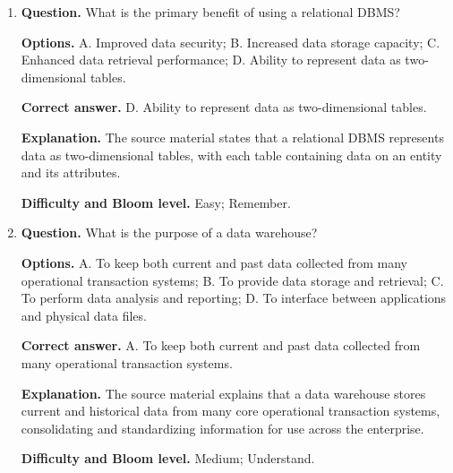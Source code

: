 \documentclass[12pt,a4paper]{article}
\begin{document}
\begin{enumerate}
        \textbf{Options.} A. To reduce data redundancy and improve data
        integrity; B. To improve data security; C. To increase data storage
        capacity; D. To enhance data retrieval performance.

        \textbf{Correct answer.} A. To reduce data redundancy and improve
        data integrity.

        \textbf{Explanation.} The source material explains that
        normalization is the process of streamlining complex groupings of
        data to minimize redundant data elements and awkward many-to-many
        relationships.

        \textbf{Difficulty and Bloom level.} Medium; Apply.

  \item \textbf{Question.} What is the primary benefit of using a relational
        DBMS?

        \textbf{Options.} A. Improved data security; B. Increased data
        storage capacity; C. Enhanced data retrieval performance;
        D. Ability to represent data as two-dimensional tables.

        \textbf{Correct answer.} D. Ability to represent data as
        two-dimensional tables.

        \textbf{Explanation.} The source material states that a relational
        DBMS represents data as two-dimensional tables, with each table
        containing data on an entity and its attributes.

        \textbf{Difficulty and Bloom level.} Easy; Remember.

  \item \textbf{Question.} What is the purpose of a data warehouse?

        \textbf{Options.} A. To keep both current and past data collected
        from many operational transaction systems; B. To provide data storage and
        retrieval; C. To perform data analysis and reporting; D. To interface
        between applications and physical data files.

        \textbf{Correct answer.} A. To keep both current and past data
        collected from many operational transaction systems.

        \textbf{Explanation.} The source material explains that a data
        warehouse stores current and historical data from many core
        operational transaction systems, consolidating and standardizing
        information for use across the enterprise.

        \textbf{Difficulty and Bloom level.} Medium; Understand.
\end{enumerate}
\end{document}
